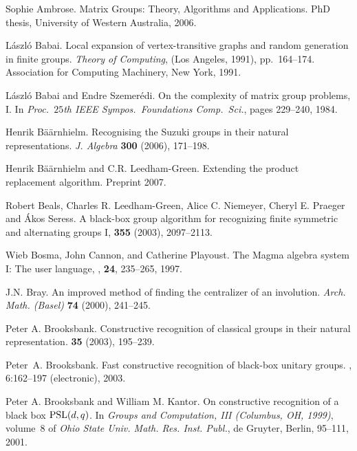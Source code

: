 \documentclass[12pt]{article}
\begin{document}
\begin{thebibliography}{10}

Sophie Ambrose. Matrix Groups: Theory, Algorithms and Applications.
PhD thesis, University of Western Australia, 2006.

L\'aszl\'o Babai.  
Local expansion of vertex-transitive graphs and
  random generation in finite groups.  {\it Theory of Computing}, (Los
  Angeles, 1991), pp.\ 164--174. Association for Computing Machinery, 
New York, 1991.

L\'aszl\'o Babai and Endre Szemer\'edi.
\newblock On the complexity of matrix group problems, {I}.
\newblock In {\em Proc.\ $25$th IEEE Sympos.\ Foundations Comp.\ Sci.}, pages
  229--240, 1984.

Henrik B\"a\"arnhielm. 
Recognising the Suzuki groups in their natural representations.  
{\it J. Algebra} {\bf 300} (2006), 171--198.
 
Henrik B\"a\"arnhielm and C.R. Leedham-Green.
Extending the product replacement algorithm.
Preprint 2007. 

 Robert Beals, Charles R. Leedham-Green, Alice C. Niemeyer,
Cheryl E. Praeger and \'Akos Seress.
\newblock A black-box group algorithm for recognizing finite symmetric
and alternating groups I,
  {\bf 355} (2003), 2097--2113.

Wieb Bosma, John Cannon, and Catherine Playoust.
\newblock The {\sc Magma} algebra system I: The user language,
, {\bf 24}, 235--265, 1997.

 J.N. Bray. An improved method of finding
the centralizer of an involution. {\it Arch. Math. (Basel)}
{\bf 74} (2000), 241--245.

Peter A. Brooksbank.
\newblock Constructive recognition of classical groups
in their natural representation.
 {\bf 35} (2003), 195--239.

Peter~A. Brooksbank.
\newblock Fast constructive recognition of black-box unitary groups.
, 6:162--197 (electronic), 2003.

Peter A. Brooksbank and William M. Kantor.
\newblock On constructive recognition of a black box {${\rm PSL}(d,q)$}.
\newblock In {\em Groups and Computation, III (Columbus, OH, 1999)}, volume~8
  of {\em Ohio State Univ. Math. Res. Inst. Publ.}, de Gruyter, Berlin,
  95--111,  2001.


\end{thebibliography}
\end{document}
